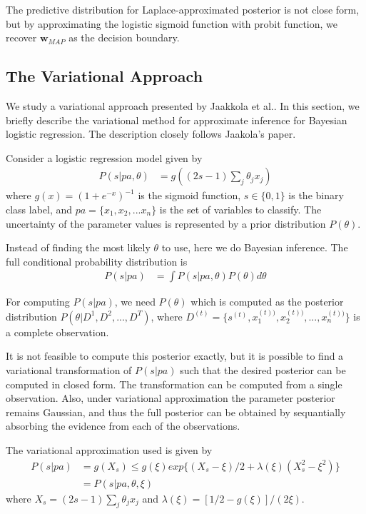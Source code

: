 The predictive distribution for Laplace-approximated posterior is not close
form, but by approximating the logistic sigmoid function with probit function,
we recover $\bm{w}_{MAP}$ as the decision boundary.

\subsection{The Variational Approach}
We study a variational approach presented by Jaakkola et al.\cite{Jaakkola96avariational}. In this section, we briefly describe the variational method for approximate inference for Bayesian logistic regression. The description closely follows Jaakola's paper.

Consider a logistic regression model given by 
\begin{align}
  P(s|pa, \theta) &= g((2s - 1)\sum_j\theta_jx_j)
\end{align}
where $g(x) = (1 + e^{-x})^{-1}$ is the sigmoid function, $s \in \{0, 1\}$ is the binary class label, and $pa = \{x_1, x_2, ... x_n\}$ is the set of variables to classify. The uncertainty of the parameter values is represented by a prior distribution $P(\theta)$.

Instead of finding the most likely $\theta$ to use, here we do Bayesian inference. The full conditional probability distribution is
\begin{align}
P(s|pa) &= \int P(s|pa, \theta)P(\theta)d\theta
\end{align}

For computing $P(s|pa)$, we need $P(\theta)$ which is computed as the posterior distribution $P(\theta| D^1, D^2, ..., D^T)$, where $D^{(t)} = \{s^{(t)}, x^{(t))}_1, x^{(t))}_2, ..., x^{(t))}_n\}$ is a complete observation. 

It is not feasible to compute this posterior exactly, but it is possible to find a variational transformation of $P(s|pa)$ such that the desired posterior can be computed in closed form. The transformation can be computed from a single observation. Also, under variational approximation the parameter posterior remains Gaussian, and thus the full posterior can be obtained by sequantially absorbing the evidence from each of the observations.

The variational approximation used is given by
\begin{align}
  P(s|pa) &= g(X_s) \leq g(\xi)exp\{(X_s - \xi)/2 + \lambda(\xi)(X_s^2 - \xi^2)\}\\
  &= P(s|pa, \theta, \xi)
\end{align}
where $X_s = (2s - 1)\sum_j\theta_jx_j$ and $\lambda(\xi) = [1/2 - g(\xi)]/(2\xi)$.

